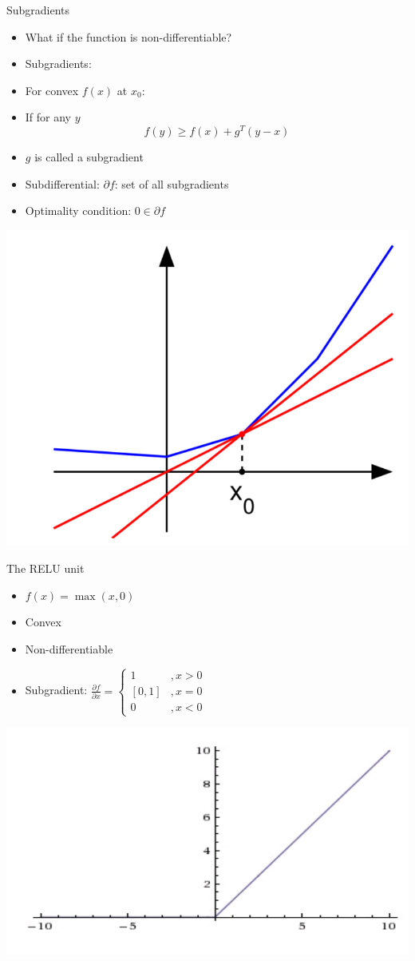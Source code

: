 \documentclass[12pt,notes,mathserif]{beamer}
\providecommand{\tightlist}{%
	\setlength{\itemsep}{0pt}\setlength{\parskip}{0pt}}
\begin{document}
\begin{frame}{Subgradients}

\begin{itemize}
\tightlist
\item
  What if the function is non-differentiable?
\item
  Subgradients:
\item
  For convex \(f(x)\) at \(x_{0}\):\\
\item
  If for any \(y\) \[f(y)\geq f(x)+g^T(y-x)\]
\item
  \(g\) is called a subgradient
\item
  Subdifferential: \(\partial f\): set of all subgradients
\item
  Optimality condition: \(0\in\partial f\)
\end{itemize}

\begin{center}
    \includegraphics[width=.375\textwidth]{2018-04-15-13-10-32.png}
\end{center}

\end{frame}

\begin{frame}{The RELU unit}

\begin{itemize}
\tightlist
\item
  \(f(x)=\max(x,0)\)
\item
  Convex
\item
  Non-differentiable
\item
  Subgradient:
  \(\frac{\partial f}{\partial x}=\begin{cases} 1 &,x>0 \\ [0,1]&,x=0 \\ 0&,x<0 \end{cases}\)
\end{itemize}

\begin{center}
    \includegraphics[width=.5\textwidth]{2018-04-15-13-10-48.png}
\end{center}

\end{frame}
\end{document}
